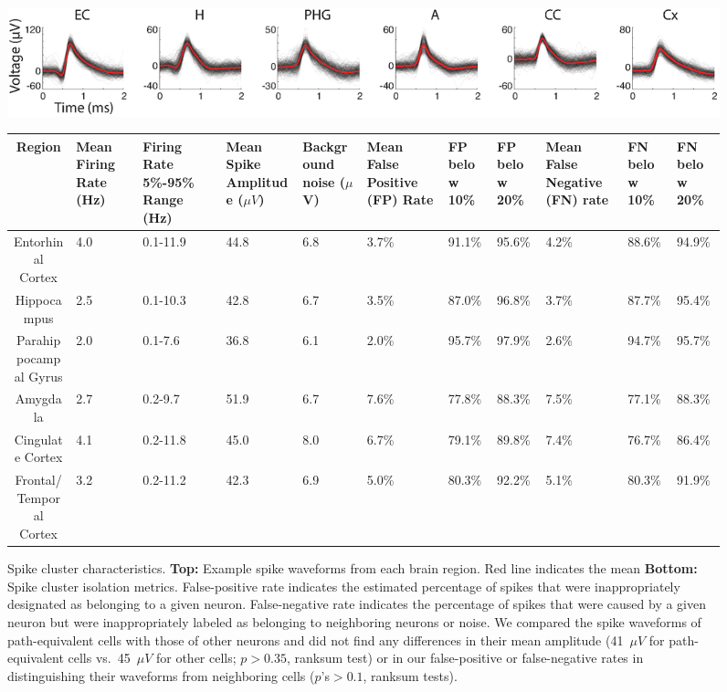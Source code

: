 	
\clearpage
\begin{figure}
\begin{center}
\includegraphics[width=.99\textwidth]{./tex/linearGrids/figs/waveforms}
\scriptsize	
 \begin{tabular}{|c|C{.5cm}|C{1cm}|C{.7cm}|C{.65cm}|C{1cm}|C{.8cm}|C{.8cm}|C{.8cm}|C{.8cm}|C{.8cm}|}
\hline
Region &Mean Firing Rate (Hz) &Firing Rate 5\%-95\% Range (Hz) &Mean Spike Amplitude ($\mu{}V$) &Background noise  ($\mu{}$V) &Mean False Positive (FP) Rate &FP below 10\% &FP below 20\% &Mean False Negative (FN) rate &FN below 10\% &FN below 20\%\\\hline
Entorhinal Cortex &4.0 &0.1-11.9 &44.8 &6.8 &3.7\% &91.1\% &95.6\% &4.2\% &88.6\% &94.9\%\\
Hippocampus &2.5 &0.1-10.3 &42.8 &6.7 &3.5\% &87.0\% &96.8\% &3.7\% &87.7\% &95.4\%\\
Parahippocampal Gyrus &2.0 &0.1-7.6 &36.8 &6.1 &2.0\% &95.7\% &97.9\% &2.6\% &94.7\% &95.7\%\\
Amygdala &2.7 &0.2-9.7 &51.9 &6.7 &7.6\% &77.8\% &88.3\% &7.5\% &77.1\% &88.3\%\\
Cingulate Cortex &4.1 &0.2-11.8 &45.0 &8.0 &6.7\% &79.1\% &89.8\% &7.4\% &76.7\% &86.4\%\\
Frontal/Temporal Cortex &3.2 &0.2-11.2 &42.3 &6.9 &5.0\% &80.3\% &92.2\% &5.1\% &80.3\% &91.9\%\\
\hline
\end{tabular}
\caption[Spike cluster characteristics]{Spike cluster characteristics. \textbf{Top:} Example spike waveforms from each brain region. Red line indicates the mean \textbf{Bottom:} Spike cluster isolation metrics. False-positive rate indicates the estimated percentage of spikes that were inappropriately designated as belonging to a given neuron.  False-negative rate indicates the percentage of spikes that were caused by a given neuron but were inappropriately labeled as belonging to neighboring neurons or noise. We compared the spike waveforms of path-equivalent cells with those of other neurons and did not find any differences in their mean amplitude (41~$\mu V$ for path-equivalent cells vs.\ 45~$\mu V$ for other cells; $p>0.35$, ranksum test) or in our false-positive or false-negative rates in  distinguishing their waveforms from neighboring cells ($p$'s$>0.1$, ranksum tests).}
\end{center}
\end{figure}	
	
